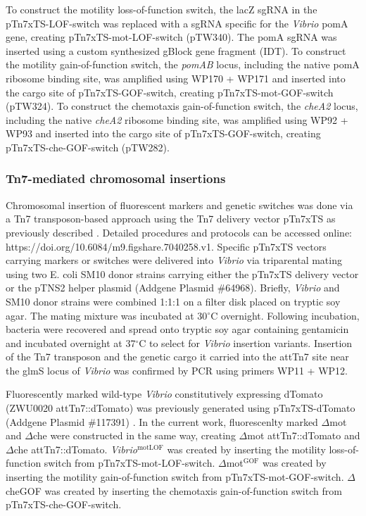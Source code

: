 To construct the motility loss-of-function switch, the lacZ sgRNA in the pTn7xTS-LOF-switch was replaced with a sgRNA specific for the \textit{Vibrio} pomA gene, creating pTn7xTS-mot-LOF-switch (pTW340). The pomA sgRNA was inserted using a custom synthesized gBlock gene fragment (IDT). To construct the motility gain-of-function switch, the \textit{pomAB} locus, including the native pomA ribosome binding site, was amplified using WP170 + WP171 and inserted into the cargo site of pTn7xTS-GOF-switch, creating pTn7xTS-mot-GOF-switch (pTW324). To construct the chemotaxis gain-of-function switch, the \textit{cheA2} locus, including the native \textit{cheA2} ribosome binding site, was amplified using WP92 + WP93 and inserted into the cargo site of pTn7xTS-GOF-switch, creating pTn7xTS-che-GOF-switch (pTW282).

\subsubsection{Tn7-mediated chromosomal insertions}
Chromosomal insertion of fluorescent markers and genetic switches was done via a Tn7 transposon-based approach using the Tn7 delivery vector pTn7xTS as previously described \cite{wiles_modernized_2018}. Detailed procedures and protocols can be accessed online: https://doi.org/10.6084/m9.figshare.7040258.v1. Specific pTn7xTS vectors carrying markers or switches were delivered into \textit{Vibrio} via triparental mating using two E. coli SM10 donor strains carrying either the pTn7xTS delivery vector or the pTNS2 helper plasmid (Addgene Plasmid \#64968). Briefly, \textit{Vibrio} and SM10 donor strains were combined 1:1:1 on a filter disk placed on tryptic soy agar. The mating mixture was incubated at 30$^\circ$C overnight. Following incubation, bacteria were recovered and spread onto tryptic soy agar containing gentamicin and incubated overnight at 37$^\circ$C to select for \textit{Vibrio} insertion variants. Insertion of the Tn7 transposon and the genetic cargo it carried into the attTn7 site near the glmS locus of \textit{Vibrio} was confirmed by PCR using primers WP11 + WP12.

Fluorescently marked wild-type \textit{Vibrio} constitutively expressing dTomato (ZWU0020 attTn7::dTomato) was previously generated using pTn7xTS-dTomato (Addgene Plasmid \#117391) \cite{wiles_modernized_2018}. In the current work, fluorescenlty marked $\Delta$mot and $\Delta$che were constructed in the same way, creating $\Delta$mot attTn7::dTomato  and $\Delta$che attTn7::dTomato. \textit{Vibrio}$^{\text{motLOF}}$ was created by inserting the motility loss-of-function switch from pTn7xTS-mot-LOF-switch. $\Delta$mot$^{\text{GOF}}$ was created by inserting the motility gain-of-function switch from pTn7xTS-mot-GOF-switch. $\Delta$cheGOF was created by inserting the chemotaxis gain-of-function switch from pTn7xTS-che-GOF-switch.

